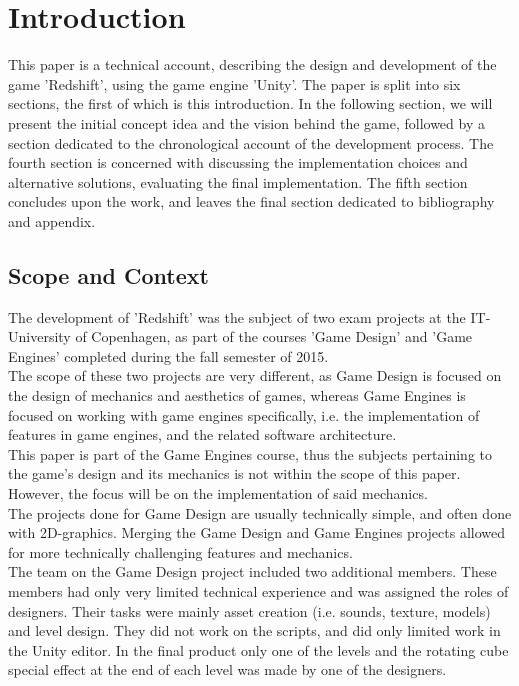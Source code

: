 \section{Introduction}
 This paper is a technical account, describing the design and development of the game 'Redshift', using the game engine 'Unity'. The paper is split into six sections, the first of which is this introduction. In the following section, we will present the initial concept idea and the vision behind the game, followed by a section dedicated to the chronological account of the development process. The fourth section is concerned with discussing the implementation choices and alternative solutions, evaluating the final implementation. The fifth section concludes upon the work, and leaves the final section dedicated to bibliography and appendix.
 
\subsection{Scope and Context}
The development of 'Redshift' was the subject of two exam projects at the IT-University of Copenhagen, as part of the courses 'Game Design' and 'Game Engines' completed during the fall semester of 2015.\\

The scope of these two projects are very different, as Game Design is focused on the design of mechanics and aesthetics of games, whereas Game Engines is focused on working with game engines specifically, i.e. the implementation of features in game engines, and the related software architecture.\\

This paper is part of the Game Engines course, thus the subjects pertaining to the game's design and its mechanics is not within the scope of this paper. However, the focus will be on the implementation of said mechanics.\\

The projects done for Game Design are usually technically simple, and often done with 2D-graphics. Merging the Game Design and Game Engines projects allowed for more technically challenging features and mechanics.\\

The team on the Game Design project included two additional members. These members had only very limited technical experience and was assigned the roles of designers. Their tasks were mainly asset creation (i.e. sounds, texture, models) and level design. They did not work on the scripts, and did only limited work in the Unity editor. In the final product only one of the levels and the rotating cube special effect at the end of each level was made by one of the designers.



